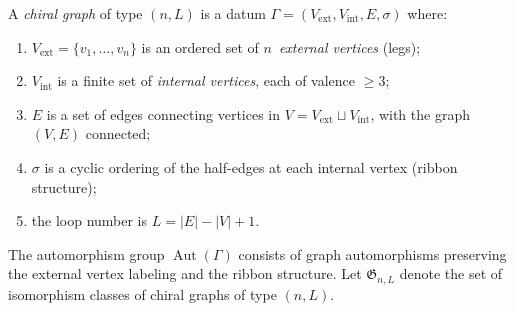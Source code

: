 \begin{definition}\label{def:chiral-graph}
A \emph{chiral graph} of type $(n, L)$ is a datum
$\Gamma = (V_{\mathrm{ext}}, V_{\mathrm{int}}, E, \sigma)$ where:
\begin{enumerate}[label=\textup{(\roman*)}]
\item $V_{\mathrm{ext}} = \{v_1, \ldots, v_n\}$ is an ordered set of
  $n$~\emph{external vertices} (legs);
\item $V_{\mathrm{int}}$ is a finite set of \emph{internal vertices},
  each of valence $\geq 3$;
\item $E$ is a set of edges connecting vertices in
  $V = V_{\mathrm{ext}} \sqcup V_{\mathrm{int}}$, with the graph
  $(V, E)$ connected;
\item $\sigma$ is a cyclic ordering of the half-edges at each internal
  vertex (ribbon structure);
\item the loop number is $L = |E| - |V| + 1$.
\end{enumerate}
The automorphism group $\operatorname{Aut}(\Gamma)$ consists of
graph automorphisms preserving the external vertex labeling and the
ribbon structure.  Let $\mathfrak{G}_{n,L}$ denote the set of
isomorphism classes of chiral graphs of type $(n, L)$.
\end{definition}

